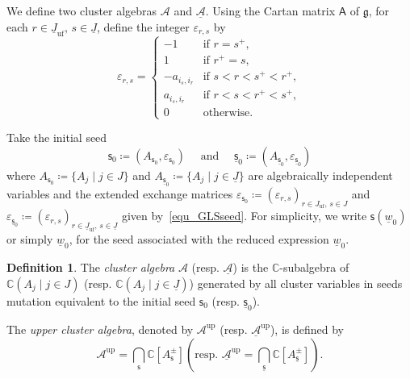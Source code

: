 \documentclass[11pt]{amsart}
\theoremstyle{plain}
\theoremstyle{definition}
\newtheorem{definition}[theorem]{Definition}
\theoremstyle{remark}
\newcommand{\C}{\mathbb{C}}
\numberwithin{equation}{section} \numberwithin{table}{section}
\numberwithin{equation}{section}
\begin{document}
We define two cluster algebras $\mathcal{A}$ and $\underline{\mathcal{A}}$. Using the Cartan matrix $\mathsf{A}$ of $\mathfrak{g}$, for each ${r \in \underline{J}_{\mathrm{uf}},\, s \in \underline{J}}$, define the integer $\varepsilon_{r,s}$ by
\begin{equation}\label{equ_GLSseed}
\varepsilon_{r,s} =
\begin{cases}
-1 & \text{if } r = s^+, \\
1 & \text{if } r^+ = s, \\
-a_{i_s,i_r} & \text{if } s < r < s^+ < r^+, \\
a_{i_s,i_r} & \text{if } r < s < r^+ < s^+, \\
0 & \text{otherwise.}
\end{cases}
\end{equation}

Take the initial seed 
$$
\mathsf{s}_0 \coloneqq (A_{\mathsf{s}_0}, \varepsilon_{\mathsf{s}_0}) \quad \mbox{ and } 
\quad \underline{\mathsf{s}}_0 \coloneqq (A_{\underline{\mathsf{s}}_0}, \varepsilon_{\underline{\mathsf{s}}_0})
$$ 
where $A_{\mathsf{s}_0} \coloneqq \{ A_{j} \mid j \in J \}$ and $A_{\underline{\mathsf{s}}_0} \coloneqq \{ A_{j} \mid j \in \underline{J} \}$ are algebraically independent variables and the extended exchange matrices $\varepsilon_{\mathsf{s}_0} \coloneqq (\varepsilon_{r,s})_{r \in J_{\mathrm{uf}},\, s \in J}$ and $\varepsilon_{\underline{\mathsf{s}}_0} \coloneqq (\varepsilon_{r,s})_{r \in \underline{J}_{\mathrm{uf}},\, s \in \underline{J}}$ given by~\eqref{equ_GLSseed}. For simplicity, we write $\mathsf{s}(\underline{w}_0)$ or simply $\underline{w}_0$, for the seed associated with the reduced expression $\underline{w}_0$.

\begin{definition}
The \emph{cluster algebra} $\mathcal{A}$ (resp. $\underline{\mathcal{A}}$) is the $\C$-subalgebra of $\C( A_{j} \mid j \in J )$ (resp. $\C( A_{j} \mid j \in \underline{J})$) generated by all cluster variables in seeds mutation equivalent to the initial seed $\mathsf{s}_0$ (resp. $\underline{\mathsf{s}}_0$).  

The \emph{upper cluster algebra}, denoted by $\mathcal{A}^\mathrm{up}$ (resp. $\underline{\mathcal{A}}^\mathrm{up}$), is defined by 
$$
\mathcal{A}^\mathrm{up} = \bigcap_{\mathsf{s}} \C[A^\pm_\mathsf{s}] \left(\mbox{resp.} \,\, \underline{\mathcal{A}}^\mathrm{up} = \bigcap_{\underline{\mathsf{s}}} \C[A^\pm_{\underline{\mathsf{s}}}]  \right).
$$ 
\end{definition}
\end{document}

